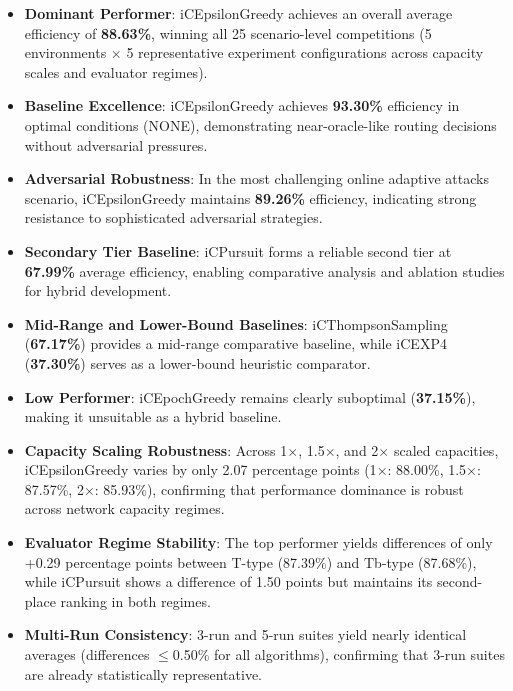 \documentclass[12pt,a4paper]{article}
\newcommand{\performance}[1]{\textcolor{performancecolor}{\textbf{#1}}}
\newcommand{\critical}[1]{\textcolor{criticalcolor}{\textbf{#1}}}
\newcommand{\success}[1]{\textcolor{successcolor}{\textbf{#1}}}
\begin{document}
\begin{tcolorbox}[colback=highlightcolor!30,colframe=performancecolor,title=\textbf{Key Experimental Results Summary (3/5-run, 1$\times$–2$\times$ Capacities, T/Tb Regimes)}]
\begin{itemize}
\item \performance{Dominant Performer}: iCEpsilonGreedy achieves an overall average efficiency of \textbf{88.63\%}, winning all 25 scenario-level competitions (5 environments $\times$ 5 representative experiment configurations across capacity scales and evaluator regimes).
\item \performance{Baseline Excellence}: iCEpsilonGreedy achieves \textbf{93.30\%} efficiency in optimal conditions (NONE), demonstrating near-oracle-like routing decisions without adversarial pressures.
\item \performance{Adversarial Robustness}: In the most challenging online adaptive attacks scenario, iCEpsilonGreedy maintains \textbf{89.26\%} efficiency, indicating strong resistance to sophisticated adversarial strategies.
\item \performance{Secondary Tier Baseline}: iCPursuit forms a reliable second tier at \textbf{67.99\%} average efficiency, enabling comparative analysis and ablation studies for hybrid development.
\item \critical{Mid-Range and Lower-Bound Baselines}: iCThompsonSampling (\textbf{67.17\%}) provides a mid-range comparative baseline, while iCEXP4 (\textbf{37.30\%}) serves as a lower-bound heuristic comparator.
\item \critical{Low Performer}: iCEpochGreedy remains clearly suboptimal (\textbf{37.15\%}), making it unsuitable as a hybrid baseline.
\item \success{Capacity Scaling Robustness}: Across 1$\times$, 1.5$\times$, and 2$\times$ scaled capacities, iCEpsilonGreedy varies by only 2.07 percentage points (1$\times$: 88.00\%, 1.5$\times$: 87.57\%, 2$\times$: 85.93\%), confirming that performance dominance is robust across network capacity regimes.
\item \success{Evaluator Regime Stability}: The top performer yields differences of only +0.29 percentage points between T-type (87.39\%) and Tb-type (87.68\%), while iCPursuit shows a difference of 1.50 points but maintains its second-place ranking in both regimes.
\item \success{Multi-Run Consistency}: 3-run and 5-run suites yield nearly identical averages (differences $\leq$0.50\% for all algorithms), confirming that 3-run suites are already statistically representative.
\end{itemize}
\end{tcolorbox}
\end{document}
